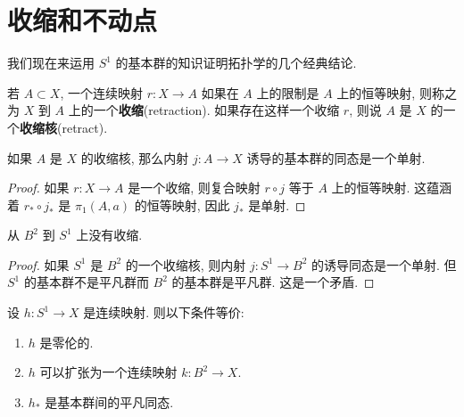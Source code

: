 \section{收缩和不动点}
\label{section:ch09-sec55}

我们现在来运用 $S^{1}$ 的基本群的知识证明拓扑学的几个经典结论.

\begin{definition}[收缩与收缩核]
\label{definition:ch09-sec55-retraction}
若 $A\subset X$, 一个连续映射 $r\colon X\to A$ 如果在 $A$ 上的限制是 $A$ 上的恒等映射, 则称之为 $X$ 到 $A$ 上的一个\textbf{收缩}(retraction). 如果存在这样一个收缩 $r$, 则说 $A$ 是 $X$ 的一个\textbf{收缩核}(retract).
\end{definition}

\begin{lemma}
\label{lemma:ch09-sec55-55-1}
如果 $A$ 是 $X$ 的收缩核, 那么内射 $j\colon A\to X$ 诱导的基本群的同态是一个单射.
\end{lemma}

\begin{proof}
如果 $r\colon X\to A$ 是一个收缩, 则复合映射 $r\circ j$ 等于 $A$ 上的恒等映射. 这蕴涵着 $r_*\circ j_*$ 是 $\pi_1(A,a)$ 的恒等映射, 因此 $j_*$ 是单射.
\end{proof}

\begin{theorem}[非收缩定理]
\label{theorem:ch09-sec55-55-2}
从 $B^{2}$ 到 $S^{1}$ 上没有收缩.
\end{theorem}

\begin{proof}
如果 $S^{1}$ 是 $B^{2}$ 的一个收缩核, 则内射 $j\colon S^{1}\to B^{2}$ 的诱导同态是一个单射. 但 $S^{1}$ 的基本群不是平凡群而 $B^{2}$ 的基本群是平凡群. 这是一个矛盾.
\end{proof}

\begin{lemma}
\label{lemma:ch09-sec55-55-3}
设 $h\colon S^{1}\to X$ 是连续映射. 则以下条件等价:
\begin{enumerate}
\item $h$ 是零伦的.
\item $h$ 可以扩张为一个连续映射 $k\colon B^{2}\to X$.
\item $h_*$ 是基本群间的平凡同态.
\end{enumerate}
\end{lemma}


